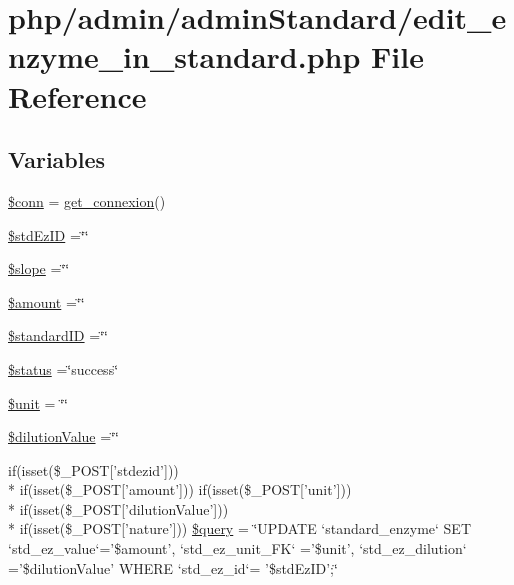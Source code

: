 \hypertarget{edit__enzyme__in__standard_8php}{\section{php/admin/admin\-Standard/edit\-\_\-enzyme\-\_\-in\-\_\-standard.php File Reference}
\label{edit__enzyme__in__standard_8php}
}
\subsection*{Variables}
\begin{DoxyCompactItemize}
\item 
\hyperlink{edit__enzyme__in__standard_8php_aa8a5a87b9c1a6a0819b88447cbe41877}{\$conn} = \hyperlink{php__functions_8php_ace18bc10f3fd08f92688ac743e0d8c2e}{get\-\_\-connexion}()
\item 
\hyperlink{edit__enzyme__in__standard_8php_a1a82343ffd9662108bf3501398fcd3fb}{\$std\-Ez\-I\-D} =\char`\"{}\char`\"{}
\item 
\hyperlink{edit__enzyme__in__standard_8php_aa6841113bca2f461aae7a334e615c44f}{\$slope} =\char`\"{}\char`\"{}
\item 
\hyperlink{edit__enzyme__in__standard_8php_af48fe050f529b6ca56356299183b7778}{\$amount} =\char`\"{}\char`\"{}
\item 
\hyperlink{edit__enzyme__in__standard_8php_a0c541a369e4a0434108a7d145751bb23}{\$standard\-I\-D} =\char`\"{}\char`\"{}
\item 
\hyperlink{edit__enzyme__in__standard_8php_a58391ea75f2d29d5d708d7050b641c33}{\$status} =\char`\"{}success\char`\"{}
\item 
\hyperlink{edit__enzyme__in__standard_8php_a1e32431b9d521850ce2aa78bc3af0040}{\$unit} = \char`\"{}\char`\"{}
\item 
\hyperlink{edit__enzyme__in__standard_8php_ad5cb2bd1aacca5b8729d0dc753091153}{\$dilution\-Value} =\char`\"{}\char`\"{}
\item 
if(isset(\$\-\_\-\-P\-O\-S\-T\mbox{[}'stdezid'\mbox{]})) \\*
if(isset(\$\-\_\-\-P\-O\-S\-T\mbox{[}'amount'\mbox{]})) if(isset(\$\-\_\-\-P\-O\-S\-T\mbox{[}'unit'\mbox{]})) \\*
if(isset(\$\-\_\-\-P\-O\-S\-T\mbox{[}'dilution\-Value'\mbox{]})) \\*
if(isset(\$\-\_\-\-P\-O\-S\-T\mbox{[}'nature'\mbox{]})) \hyperlink{edit__enzyme__in__standard_8php_a5e1ed82c80f5fde645e49c881fe6b64f}{\$query} = \char`\"{}U\-P\-D\-A\-T\-E `standard\-\_\-enzyme` S\-E\-T `std\-\_\-ez\-\_\-value`='\$amount', `std\-\_\-ez\-\_\-unit\-\_\-\-F\-K` ='\$unit', `std\-\_\-ez\-\_\-dilution` ='\$dilution\-Value' W\-H\-E\-R\-E `std\-\_\-ez\-\_\-id`= '\$std\-Ez\-I\-D';\char`\"{}

\end{DoxyCompactItemize}
